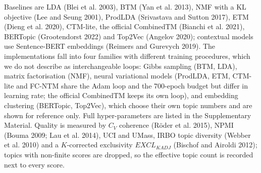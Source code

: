 \documentclass[Journal,letterpaper,NoLists]{ascelike-new}
\begin{document}
Baselines are LDA (Blei et al. 2003), BTM (Yan et al. 2013), NMF with a KL objective
(Lee and Seung 2001), ProdLDA (Srivastava and
  Sutton 2017), ETM (Dieng et al. 2020), CTM-lite, the
official CombinedTM (Bianchi et al. 2021), BERTopic (Grootendorst 2022) and Top2Vec
(Angelov 2020); contextual models use Sentence-BERT embeddings
(Reimers and
  Gurevych 2019). The implementations fall into four families with different training
procedures, which we do not describe as interchangeable loops: Gibbs sampling (BTM, LDA), matrix
factorisation (NMF), neural variational models (ProdLDA, ETM, CTM-lite and FC-NTM share the Adam
loop and the 700-epoch budget but differ in learning rate; the official CombinedTM keeps its own
loop), and embedding clustering (BERTopic, Top2Vec), which choose their own topic numbers and are
shown for reference only. Full hyper-parameters are listed in the Supplementary Material. Quality
is measured by $C_V$ coherence (R\"oder et al. 2015), NPMI (Bouma 2009; Lau et al. 2014), UCI
and UMass, IRBO topic diversity (Webber et al. 2010) and a $K$-corrected exclusivity
$EXCL_{KADJ}$ (Bischof and
  Airoldi 2012); topics with non-finite scores are dropped, so the
effective topic count is recorded next to every score.
\end{document}
